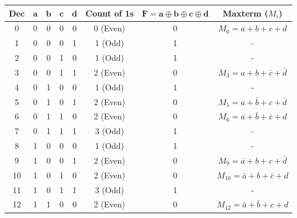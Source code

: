 \documentclass[12pt,a3paper]{article}
\begin{document}
\begin{enumerate}
\begin{tcolorbox}[enhanced,breakable,ansbox,colback=cA!4,colframe=cA,boxrule=0.8pt,arc=5pt,title={\textbf{Answer}},fonttitle=\bfseries\color{white},colbacktitle=cA]
\begin{center}
\renewcommand{\arraystretch}{1.1}
\begin{tabular}{ccccc|c|c|c}
    \toprule
    \textbf{Dec} & $\mathbf{a}$ & $\mathbf{b}$ & $\mathbf{c}$ & $\mathbf{d}$ & \textbf{Count of 1s} & $\mathbf{F = a \oplus b \oplus c \oplus d}$ & \textbf{Maxterm} ($M_i$) \\
    \midrule
    \textcolor{cA}{0} & \textcolor{cA}{0} & \textcolor{cA}{0} & \textcolor{cA}{0} & \textcolor{cA}{0} & \textcolor{cA}{0 (Even)} & \textcolor{cA}{0} & \textcolor{cA}{$M_0 = a + b + c + d$} \\
    1 & 0 & 0 & 0 & 1 & 1 (Odd)  & 1 & - \\
    2 & 0 & 0 & 1 & 0 & 1 (Odd)  & 1 & - \\
    \textcolor{cA}{3} & \textcolor{cA}{0} & \textcolor{cA}{0} & \textcolor{cA}{1} & \textcolor{cA}{1} & \textcolor{cA}{2 (Even)} & \textcolor{cA}{0} & \textcolor{cA}{$M_3 = a + b + \bar{c} + \bar{d}$} \\
    4 & 0 & 1 & 0 & 0 & 1 (Odd)  & 1 & - \\
    \textcolor{cA}{5} & \textcolor{cA}{0} & \textcolor{cA}{1} & \textcolor{cA}{0} & \textcolor{cA}{1} & \textcolor{cA}{2 (Even)} & \textcolor{cA}{0} & \textcolor{cA}{$M_5 = a + \bar{b} + c + \bar{d}$} \\
    \textcolor{cA}{6} & \textcolor{cA}{0} & \textcolor{cA}{1} & \textcolor{cA}{1} & \textcolor{cA}{0} & \textcolor{cA}{2 (Even)} & \textcolor{cA}{0} & \textcolor{cA}{$M_6 = a + \bar{b} + \bar{c} + d$} \\
    7 & 0 & 1 & 1 & 1 & 3 (Odd)  & 1 & - \\
    8 & 1 & 0 & 0 & 0 & 1 (Odd)  & 1 & - \\
    \textcolor{cA}{9} & \textcolor{cA}{1} & \textcolor{cA}{0} & \textcolor{cA}{0} & \textcolor{cA}{1} & \textcolor{cA}{2 (Even)} & \textcolor{cA}{0} & \textcolor{cA}{$M_9 = \bar{a} + b + c + \bar{d}$} \\
    \textcolor{cA}{10} & \textcolor{cA}{1} & \textcolor{cA}{0} & \textcolor{cA}{1} & \textcolor{cA}{0} & \textcolor{cA}{2 (Even)} & \textcolor{cA}{0} & \textcolor{cA}{$M_{10} = \bar{a} + b + \bar{c} + d$} \\
    11 & 1 & 0 & 1 & 1 & 3 (Odd)  & 1 & - \\
    \textcolor{cA}{12} & \textcolor{cA}{1} & \textcolor{cA}{1} & \textcolor{cA}{0} & \textcolor{cA}{0} & \textcolor{cA}{2 (Even)} & \textcolor{cA}{0} & \textcolor{cA}{$M_{12} = \bar{a} + \bar{b} + c + d$} \\

\end{tabular}
\end{center}
\end{tcolorbox}
\end{enumerate}
\end{document}
